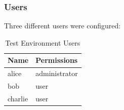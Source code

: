 \subsubsection{Users}
Three different users were configured:
\begin{table}[H]
    \centering
    \begin{tabular}{p{4cm} p{8cm}} \hline
        \textbf{Name} & \textbf{Permissions}  \\ \hline
        alice & administrator  \\ \hline
        bob & user  \\ \hline
        charlie & user  \\ \hline
    \end{tabular}
    \caption{Test Environment Users}
\end{table}